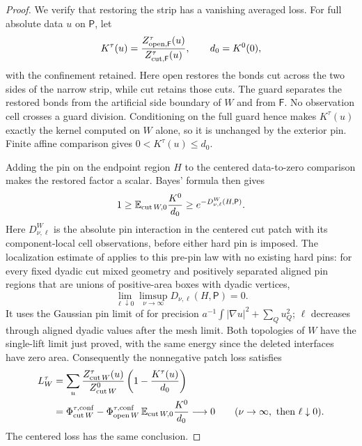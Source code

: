 \begin{proof}
We verify that restoring the strip has a vanishing averaged loss.
For full absolute data \(u\) on \(\mathsf P\), let
\[
 K^\tau(u)=\frac{Z_{\rm open,\mathsf F}^\tau(u)}
                 {Z_{\rm cut,\mathsf F}^\tau(u)},
 \qquad d_0=K^0(0),
\]
with the confinement retained.  Here \(\mathrm{open}\) restores the bonds
cut across the two sides of the narrow strip, while \(\mathrm{cut}\)
retains those cuts.  The guard separates the restored bonds
from the artificial side boundary of \(W\) and from \(\mathsf F\).
No observation cell crosses a guard division.  Conditioning on the full
guard hence makes
\(K^\tau(u)\) exactly the kernel computed on \(W\) alone, so it is
unchanged by the exterior pin.  Finite affine comparison gives
\(0<K^\tau(u)\le d_0\).

Adding the pin on the endpoint region \(H\) to the centered
data-to-zero comparison makes the restored factor a scalar.
Bayes' formula then gives
\[
 1\ge\mathbb E_{{\rm cut}\,W,0}\frac{K^0}{d_0}
       \ge e^{-D_{\nu,\ell}^{W}(H,\mathsf P)}.
\]
Here \(D_{\nu,\ell}^{W}\) is the absolute pin interaction in the centered
cut patch with its component-local cell observations, before either
hard pin is imposed.  The localization estimate of
\cite[Lemma~3.2]{S} applies to this pre-pin law with no existing hard
pins: for every fixed dyadic cut mixed geometry and positively separated
aligned pin regions that are unions of positive-area boxes with dyadic vertices,
\begin{equation}\label{geo:cell-pin-localization}
 \lim_{\ell\downarrow0}\limsup_{\nu\to\infty}
                  D_{\nu,\ell}(H,\mathsf P)=0.
\end{equation}
It uses the Gaussian pin limit of \cite[Theorem~3.2]{C} for precision
\(a^{-1}\int|\nabla u|^2+\sum_Q u_Q^2\); \(\ell\) decreases through
aligned dyadic values after the mesh limit.  Both topologies of \(W\)
have the single-lift limit just proved, with the same energy since the
deleted interfaces have zero area.  Consequently the nonnegative patch
loss satisfies
\begin{align*}
 L_W^\tau
 &=\sum_u\frac{Z_{{\rm cut}\,W}^\tau(u)}{Z_{{\rm cut}\,W}^0}
                    \left(1-\frac{K^\tau(u)}{d_0}\right)\\
 &=\Phi_{{\rm cut}\,W}^{\tau,\mathrm{conf}}-
       \Phi_{{\rm open}\,W}^{\tau,\mathrm{conf}}\,
                    \mathbb E_{{\rm cut}\,W,0}\frac{K^0}{d_0}
       \longrightarrow0
       \qquad(\nu\to\infty,\text{ then }\ell\downarrow0).
\end{align*}
The centered loss has the same conclusion.


\end{proof}
